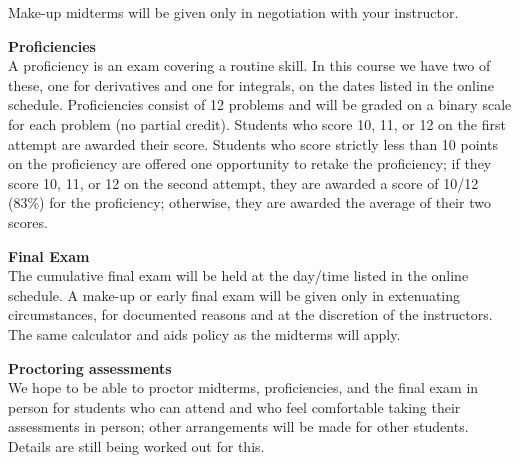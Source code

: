 \documentclass[12pt]{article}
\renewcommand{\emph}[1]{\textsf{\textbf{#1}}}
\newcommand{\localhead}[1]{\par\smallskip\textbf{#1}\nobreak\\}%
\def\heading#1{\localhead{\large\emph{#1}}}
\begin{document}
Make-up midterms will be given only in negotiation with your instructor.

\heading{Proficiencies}
A proficiency is an exam covering a routine skill.  In this course we have two of these, one for derivatives and one for integrals, on the dates listed in the online schedule.  Proficiencies consist of 12 problems and will be graded on a binary scale for each problem (no partial credit). Students who score 10, 11, or 12 on the first attempt are awarded their score. Students who score strictly less than 10 points on the proficiency are offered one opportunity to retake the proficiency; if they score 10, 11, or 12 on the second attempt, they are awarded a score of 10/12 (83\%) for the proficiency; otherwise, they are awarded the average of their two scores.   


\heading{Final Exam}
The cumulative final exam will be held at the day/time listed in the online schedule. A make-up or early final exam will be given only in extenuating circumstances, for documented reasons and at the discretion of the instructors.
The same calculator and aids policy as the midterms will apply.


\heading{Proctoring assessments}
We hope to be able to proctor midterms, proficiencies, and the final exam in person for students who can attend and who feel comfortable taking their assessments in person; other arrangements will be made for other students. Details are still being worked out for this.
\end{document}
